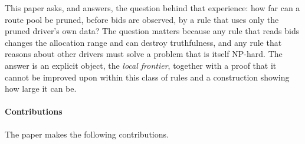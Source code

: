 \documentclass[review,12pt]{elsarticle}
\theoremstyle{definition}
\theoremstyle{remark}
\begin{document}
This paper asks, and answers, the question behind that experience: how far
can a route pool be pruned, before bids are observed, by a rule that uses
only the pruned driver's own data? The question matters because any rule
that reads bids changes the allocation range and can destroy truthfulness,
and any rule that reasons about other drivers must solve a problem that is
itself NP-hard. The answer is an explicit object, the \emph{local
frontier}, together with a proof that it cannot be improved upon within
this class of rules and a construction showing how large it can be.

\paragraph{Contributions} The paper makes the following contributions.
\end{document}
